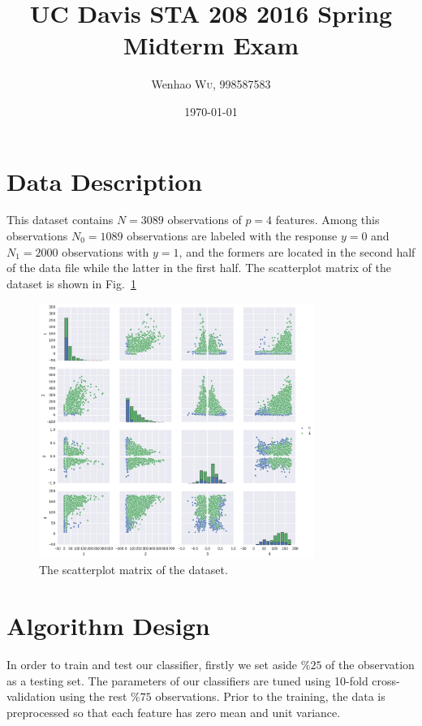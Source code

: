 \documentclass{article}
\title{UC Davis STA 208 2016 Spring Midterm Exam} %
\author{Wenhao \textsc{Wu}, 998587583} %
\date{\today} %
\begin{document}
\maketitle %


\section{Data Description}
This dataset contains $N=3089$ observations of $p=4$ features. Among this
observations $N_0=1089$ observations are labeled with the response $y=0$ and
$N_1= 2000$ observations with $y=1$, and the formers are located in the second
half of the data file while the latter in the first half.
The scatterplot matrix of the dataset is shown in Fig.~\ref{fig:scatterplot}
\begin{figure}[h]
  \centering
  \includegraphics[width=0.8\textwidth]{figs/scatterplot.pdf}
  \caption{The scatterplot matrix of the dataset.}
  \label{fig:scatterplot}
\end{figure}

\section{Algorithm Design}
In order to train and test our classifier, firstly we set aside $\%25$ of the
observation as a testing set. The parameters of our classifiers are tuned
using 10-fold cross-validation using the rest $\%75$ observations.
Prior to the training, the data is preprocessed so that each feature has zero
mean and unit variance.
\end{document}
